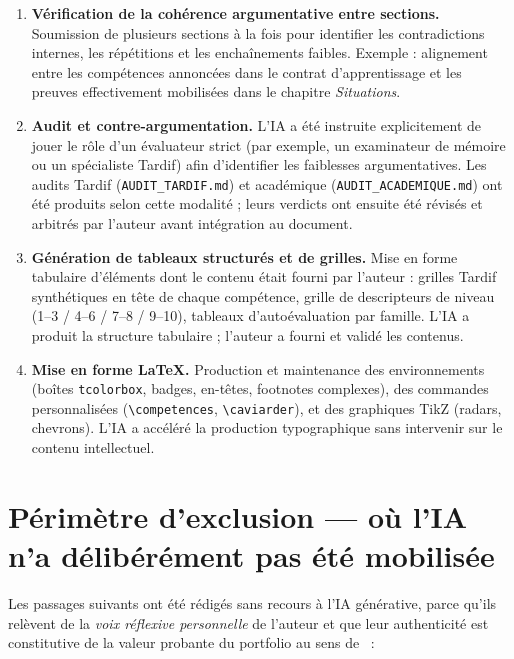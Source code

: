 \begin{enumerate}
  \item \textbf{Vérification de la cohérence argumentative entre sections.} Soumission de plusieurs sections à la fois pour identifier les contradictions internes, les répétitions et les enchaînements faibles. Exemple : alignement entre les compétences annoncées dans le contrat d'apprentissage et les preuves effectivement mobilisées dans le chapitre \emph{Situations}.
  \item \textbf{Audit et contre-argumentation.} L'IA a été instruite explicitement de jouer le rôle d'un évaluateur strict (par exemple, un examinateur de mémoire ou un spécialiste Tardif) afin d'identifier les faiblesses argumentatives. Les audits Tardif (\texttt{AUDIT\_TARDIF.md}) et académique (\texttt{AUDIT\_ACADEMIQUE.md}) ont été produits selon cette modalité ; leurs verdicts ont ensuite été révisés et arbitrés par l'auteur avant intégration au document.
  \item \textbf{Génération de tableaux structurés et de grilles.} Mise en forme tabulaire d'éléments dont le contenu était fourni par l'auteur : grilles Tardif synthétiques en tête de chaque compétence, grille de descripteurs de niveau (1--3 / 4--6 / 7--8 / 9--10), tableaux d'autoévaluation par famille. L'IA a produit la structure tabulaire ; l'auteur a fourni et validé les contenus.
  \item \textbf{Mise en forme \LaTeX{}.} Production et maintenance des environnements (boîtes \texttt{tcolorbox}, badges, en-têtes, footnotes complexes), des commandes personnalisées (\verb|\competences|, \verb|\caviarder|), et des graphiques TikZ (radars, chevrons). L'IA a accéléré la production typographique sans intervenir sur le contenu intellectuel.
\end{enumerate}

\section{Périmètre d'exclusion --- où l'IA n'a délibérément pas été mobilisée}

Les passages suivants ont été rédigés sans recours à l'IA générative, parce qu'ils relèvent de la \emph{voix réflexive personnelle} de l'auteur et que leur authenticité est constitutive de la valeur probante du portfolio au sens de~\citet{tardif2006} :

